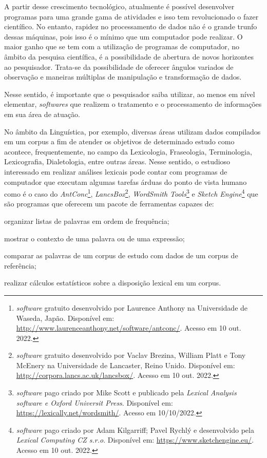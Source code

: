 \documentclass[portuguese]{textolivre}
\begin{document}
A partir desse crescimento tecnológico, atualmente é possível desenvolver programas para uma grande gama de atividades e isso tem revolucionado o fazer científico. No entanto, rapidez no processamento de dados não é o grande trunfo dessas máquinas, pois isso é o mínimo que um computador pode realizar. O maior ganho que se tem com a utilização de programas de computador, no âmbito da pesquisa científica, é a possibilidade de abertura de novos horizontes ao pesquisador. Trata-se da possibilidade  de oferecer ângulos variados de observação e maneiras múltiplas de manipulação e transformação de dados.

Nesse sentido, é importante que o pesquisador saiba utilizar, ao menos em nível elementar, \emph{softwares} que realizem o tratamento e o processamento de informações em sua área de atuação. 

No âmbito da Linguística, por exemplo, diversas áreas utilizam dados compilados em um corpus a fim de atender os objetivos de determinado estudo como acontece, frequentemente, no campo da Lexicologia, Fraseologia, Terminologia, Lexicografia, Dialetologia, entre outras áreas. Nesse sentido, o estudioso interessado em realizar análises lexicais pode contar com programas de computador que executam algumas tarefas árduas do ponto de vista humano como é o caso do \emph{AntConc}\footnote{\emph{software} gratuito desenvolvido por Laurence Anthony na Universidade de Waseda, Japão. Disponível em:  \url{http://www.laurenceanthony.net/software/antconc/}. Acesso em 10 out. 2022.},  \emph{LancsBox}\footnote{\emph{software} gratuito desenvolvido por Vaclav Brezina, William Platt e Tony McEnery na Universidade de Lancaster, Reino Unido. Disponível em: \url{http://corpora.lancs.ac.uk/lancsbox/}. Acesso em 10 out. 2022.}, \emph{WordSmith Tools}\footnote{\emph{software} pago criado por Mike Scott e publicado pela \emph{Lexical Analysis software e Oxford Universit Press}.  Disponível em: \url{https://lexically.net/wordsmith/}. Acesso em 10/10/2022.} e \emph{Sketch Engine}\footnote{\emph{software} pago criado por Adam Kilgarriff; Pavel Rychlý e desenvolvido pela \emph{Lexical Computing CZ s.r.o}. Disponível em: \url{https://www.sketchengine.eu/}. Acesso em 10 out. 2022.} que são programas que oferecem um pacote de ferramentas capazes de: 
\begin{enumerate*}[label=\roman*)]
\item organizar listas de palavras em ordem de frequência;  
\item mostrar o contexto de uma palavra ou de uma expressão; 
\item comparar as palavras de um corpus de estudo com dados de um corpus de referência; 
\item realizar cálculos estatísticos sobre a disposição lexical em um corpus. 
\end{enumerate*}
\end{document}
